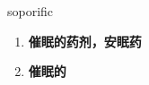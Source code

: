 
\begin{frame}
{\huge soporific}
\begin{center}
\begin{enumerate}\Large
  \item \textbf{催眠的药剂，安眠药}
  \item \textbf{催眠的}
\end{enumerate}
\end{center}
\end{frame}
